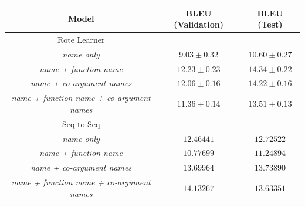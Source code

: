 \begin{table}[!ht]
\begin{center}
\begin{tabular}{ c | c | c }
    Model                               & BLEU (Validation)            & BLEU (Test)  \\
    \hline
    \hline
    Rote Learner                        &                  & \\    
     \textit{name only}                & $ 9.03  \pm  0.32 $ & $ 10.60 \pm 0.27 $  \\
     \textit{name + function name}     & $ 12.23 \pm  0.23 $ & $ 14.34 \pm 0.22 $  \\
     \textit{name + co-argument names}        & $ 12.06 \pm  0.16 $ & $ 14.22 \pm 0.16 $  \\
     \textit{name + function name + co-argument names}  & $ 11.36 \pm  0.14 $ & $ 13.51 \pm 0.13 $ \\
    \hline
    \hline
    Seq to Seq                          &                  & \\
     \textit{name only}                & $ 12.46441 $ & $ 12.72522 $  \\
     \textit{name + function name}     & $ 10.77699 $ & $ 11.24894 $ \\
     \textit{name + co-argument names}      & $ 13.69964 $ & $ 13.73890 $  \\
     \textit{name + function name + co-argument names} & $ 14.13267 $ & $ 13.63351 $ \\

\end{tabular}
\end{center}
\end{table}
